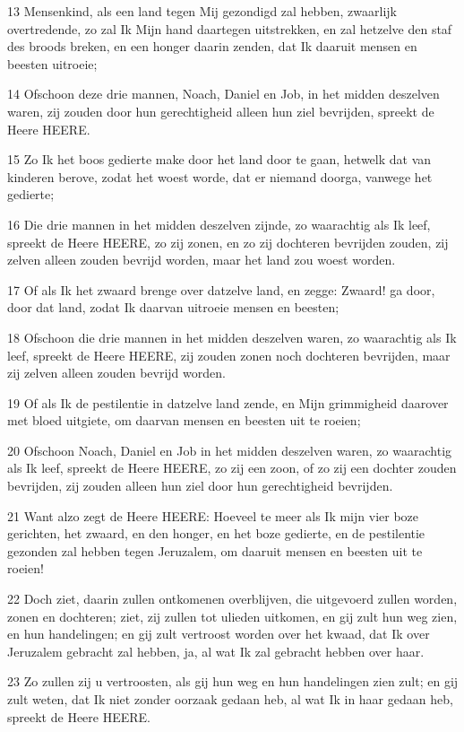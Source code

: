 \par 13 Mensenkind, als een land tegen Mij gezondigd zal hebben, zwaarlijk overtredende, zo zal Ik Mijn hand daartegen uitstrekken, en zal hetzelve den staf des broods breken, en een honger daarin zenden, dat Ik daaruit mensen en beesten uitroeie;
\par 14 Ofschoon deze drie mannen, Noach, Daniel en Job, in het midden deszelven waren, zij zouden door hun gerechtigheid alleen hun ziel bevrijden, spreekt de Heere HEERE.
\par 15 Zo Ik het boos gedierte make door het land door te gaan, hetwelk dat van kinderen berove, zodat het woest worde, dat er niemand doorga, vanwege het gedierte;
\par 16 Die drie mannen in het midden deszelven zijnde, zo waarachtig als Ik leef, spreekt de Heere HEERE, zo zij zonen, en zo zij dochteren bevrijden zouden, zij zelven alleen zouden bevrijd worden, maar het land zou woest worden.
\par 17 Of als Ik het zwaard brenge over datzelve land, en zegge: Zwaard! ga door, door dat land, zodat Ik daarvan uitroeie mensen en beesten;
\par 18 Ofschoon die drie mannen in het midden deszelven waren, zo waarachtig als Ik leef, spreekt de Heere HEERE, zij zouden zonen noch dochteren bevrijden, maar zij zelven alleen zouden bevrijd worden.
\par 19 Of als Ik de pestilentie in datzelve land zende, en Mijn grimmigheid daarover met bloed uitgiete, om daarvan mensen en beesten uit te roeien;
\par 20 Ofschoon Noach, Daniel en Job in het midden deszelven waren, zo waarachtig als Ik leef, spreekt de Heere HEERE, zo zij een zoon, of zo zij een dochter zouden bevrijden, zij zouden alleen hun ziel door hun gerechtigheid bevrijden.
\par 21 Want alzo zegt de Heere HEERE: Hoeveel te meer als Ik mijn vier boze gerichten, het zwaard, en den honger, en het boze gedierte, en de pestilentie gezonden zal hebben tegen Jeruzalem, om daaruit mensen en beesten uit te roeien!
\par 22 Doch ziet, daarin zullen ontkomenen overblijven, die uitgevoerd zullen worden, zonen en dochteren; ziet, zij zullen tot ulieden uitkomen, en gij zult hun weg zien, en hun handelingen; en gij zult vertroost worden over het kwaad, dat Ik over Jeruzalem gebracht zal hebben, ja, al wat Ik zal gebracht hebben over haar.
\par 23 Zo zullen zij u vertroosten, als gij hun weg en hun handelingen zien zult; en gij zult weten, dat Ik niet zonder oorzaak gedaan heb, al wat Ik in haar gedaan heb, spreekt de Heere HEERE.

